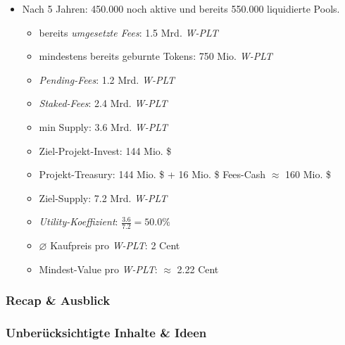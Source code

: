 \begin{Example}
\begin{itemize}
\begin{itemize}
	\end{itemize}
	\item Nach 5 Jahren: 450.000 noch aktive und bereits 550.000 liquidierte Pools.
	\begin{itemize}
		\item bereits \textit{umgesetzte Fees}: 1.5 Mrd. \textit{W-PLT} 
		\item mindestens bereits geburnte Tokens: 750 Mio. \textit{W-PLT}
		\item \textit{Pending-Fees}: 1.2 Mrd. \textit{W-PLT}
		\item \textit{Staked-Fees}: 2.4 Mrd. \textit{W-PLT} 
		\item min Supply: 3.6 Mrd. \textit{W-PLT} 
		\item Ziel-Projekt-Invest: 144 Mio. \$
		\item Projekt-Treasury: 144 Mio. \$ + 16 Mio. \$ Fees-Cash $\approx$ 160 Mio. \$
		\item Ziel-Supply: 7.2 Mrd. \textit{W-PLT}
		\item \textit{Utility-Koeffizient}: $\frac{3.6}{7.2} = 50.0 \%$
		\item $\varnothing$ Kaufpreis pro \textit{W-PLT}: 2 Cent
		\item Mindest-Value pro \textit{W-PLT}: $\approx$ 2.22 Cent		
	\end{itemize}	 
\end{itemize}

\end{Example}

\vspace{0.5cm}


\vspace{0.5cm}



\subsubsection{Recap \& Ausblick}
\vspace{0.2cm}



\vspace{0.5cm}



\subsubsection{Unberücksichtigte Inhalte \& Ideen}

